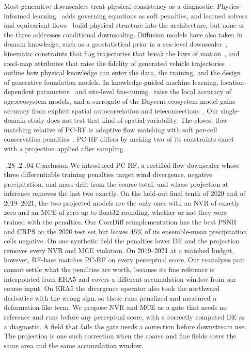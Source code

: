 \documentclass[sigconf,nonacm]{acmart}
\makeatletter
\newcommand{\pcrf}{\textsc{PC-RF}\xspace}
\renewcommand\section{\def\@toclevel{1}%
  \@startsection{section}{1}{\z@}%
  {-.28\baselineskip \@plus -1\p@ \@minus -.2\p@}%
  {.04\baselineskip}%
  {\ACM@NRadjust\@secfont}}
\makeatother
\begin{document}
Most generative downscalers treat physical consistency as a diagnostic. Physics-informed learning~\citep{raissi2019physics} adds governing equations as soft penalties, and learned solvers and equivariant flows~\citep{kochkov2021machine,kohler2020equivariant} build physical structure into the architecture, but none of the three addresses conditional downscaling. Diffusion models have also taken in domain knowledge, such as a geostatistical prior in a sea-level downscaler~\citep{ghosh2024kriging}, kinematic constraints that flag trajectories that break the laws of motion~\citep{sharma2025physics}, and road-map attributes that raise the fidelity of generated vehicle trajectories~\citep{yang2025geolucid}. \citet{farhadloo2025physics} outline how physical knowledge can enter the data, the training, and the design of generative foundation models. In knowledge-guided machine learning, location-dependent parameters~\citep{sharma2025spatial} and site-level fine-tuning~\citep{zeng2025finetuning} raise the local accuracy of agroecosystem models, and a surrogate of the Daycent ecosystem model gains accuracy from explicit spatial autocorrelation and teleconnections~\citep{zhang2025surrogate}. Our single-domain study does not test that kind of spatial variability. The closest flow-matching relative of \pcrf is adaptive flow matching with soft per-cell conservation penalties~\citep{debeire2026physics}. \pcrf differs by making two of its constraints exact with a projection applied after sampling.

\section{Conclusion}
\label{sec:conclusion}
We introduced \pcrf, a rectified-flow downscaler whose three differentiable training penalties target wind divergence, negative precipitation, and mass drift from the coarse total, and whose projection at inference removes the last two exactly. On the held-out final tenth of 2020 and of 2019--2021, the two projected models are the only ones with an NVR of exactly zero and an MCE of zero up to float32 rounding, whether or not they were trained with the penalties. Our CorrDiff reimplementation has the best PSNR and CRPS on the 2020 test set but leaves 45\% of its ensemble-mean precipitation cells negative. On one synthetic field the penalties lower DE and the projection removes every NVR and MCE violation. On 2019--2021 at a matched budget, however, RF-base matches \pcrf on every perceptual score. Our reanalysis pair cannot settle what the penalties are worth, because its fine reference is interpolated from ERA5 and covers a different accumulation window from our coarse input. On ERA5 the divergence operator also took the northward derivative with the wrong sign, so those runs penalized and measured a deformation-like term. We propose NVR and MCE as a gate that needs no reference and runs before any perceptual score, with a correctly computed DE as a diagnostic. A field that fails the gate needs a correction before downstream use. The projection is one such correction when the coarse and fine fields cover the same area and the same accumulation window.
\end{document}
